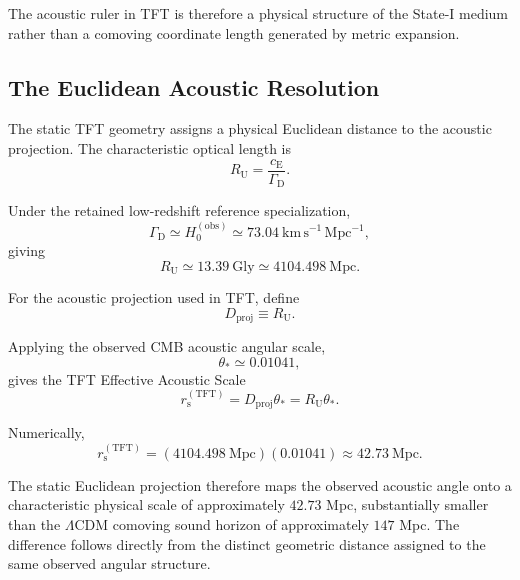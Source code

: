 The acoustic ruler in TFT is therefore a physical structure of the State-I medium rather than a comoving coordinate length generated by metric expansion.


\subsection{The Euclidean Acoustic Resolution}
\label{sec:euclidean_acoustic_resolution}

The static TFT geometry assigns a physical Euclidean distance to the acoustic projection. The characteristic optical length is
\begin{equation}
    R_{\mathrm U}
    =
    \frac{c_{\mathrm E}}{\Gamma_{\mathrm D}}.
\end{equation}

Under the retained low-redshift reference specialization,
\begin{equation}
    \Gamma_{\mathrm D}
    \simeq
    H_0^{(\mathrm{obs})}
    \simeq
    73.04\ \mathrm{km\,s^{-1}\,Mpc^{-1}},
\end{equation}
giving
\begin{equation}
    R_{\mathrm U}
    \simeq
    13.39\ \mathrm{Gly}
    \simeq
    4104.498\ \mathrm{Mpc}.
\end{equation}

For the acoustic projection used in TFT, define
\begin{equation}
    D_{\mathrm{proj}}
    \equiv
    R_{\mathrm U}.
\end{equation}

Applying the observed CMB acoustic angular scale,
\begin{equation}
    \theta_*
    \simeq
    0.01041,
\end{equation}
gives the TFT Effective Acoustic Scale
\begin{equation}
    r_{\mathrm s}^{(\mathrm{TFT})}
    =
    D_{\mathrm{proj}}\theta_*
    =
    R_{\mathrm U}\theta_*.
\end{equation}

Numerically,
\begin{equation}
    r_{\mathrm s}^{(\mathrm{TFT})}
    =
    (4104.498\ \mathrm{Mpc})
    (0.01041)
    \approx
    42.73\ \mathrm{Mpc}.
\end{equation}

The static Euclidean projection therefore maps the observed acoustic angle onto a characteristic physical scale of approximately $42.73$ Mpc, substantially smaller than the $\Lambda$CDM comoving sound horizon of approximately $147$ Mpc. The difference follows directly from the distinct geometric distance assigned to the same observed angular structure.


